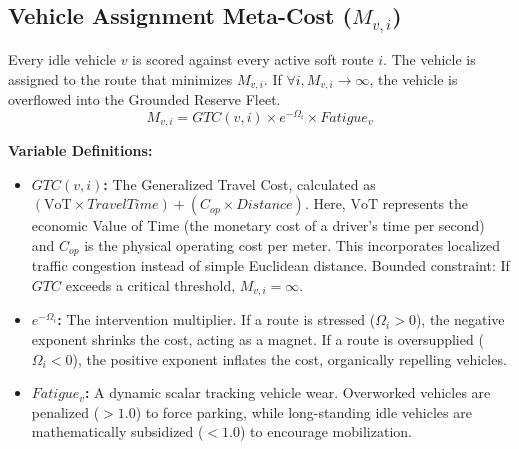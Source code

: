 \documentclass[12pt,a4paper]{article}
\begin{document}
\subsection[Vehicle Assignment Meta-Cost (M v,i)]{Vehicle Assignment Meta-Cost ($M_{v, i}$)}
Every idle vehicle $v$ is scored against every active soft route $i$. The vehicle is assigned to the route that minimizes $M_{v, i}$. If $\forall i, M_{v, i} \to \infty$, the vehicle is overflowed into the Grounded Reserve Fleet.
\begin{equation}
    M_{v, i} = GTC(v, i) \times e^{-\Omega_i} \times Fatigue_v
\end{equation}

\textbf{Variable Definitions:}
\begin{itemize}
    \item \textbf{$GTC(v, i)$:} The Generalized Travel Cost, calculated as $(\text{VoT} \times TravelTime) + (C_{op} \times Distance)$. Here, $\text{VoT}$ represents the economic Value of Time (the monetary cost of a driver's time per second) and $C_{op}$ is the physical operating cost per meter. This incorporates localized traffic congestion instead of simple Euclidean distance. Bounded constraint: If $GTC$ exceeds a critical threshold, $M_{v, i} = \infty$.
    \item \textbf{$e^{-\Omega_i}$:} The intervention multiplier. If a route is stressed ($\Omega_i > 0$), the negative exponent shrinks the cost, acting as a magnet. If a route is oversupplied ($\Omega_i < 0$), the positive exponent inflates the cost, organically repelling vehicles.
    \item \textbf{$Fatigue_v$:} A dynamic scalar tracking vehicle wear. Overworked vehicles are penalized ($>1.0$) to force parking, while long-standing idle vehicles are mathematically subsidized ($<1.0$) to encourage mobilization.
\end{itemize}
\end{document}
